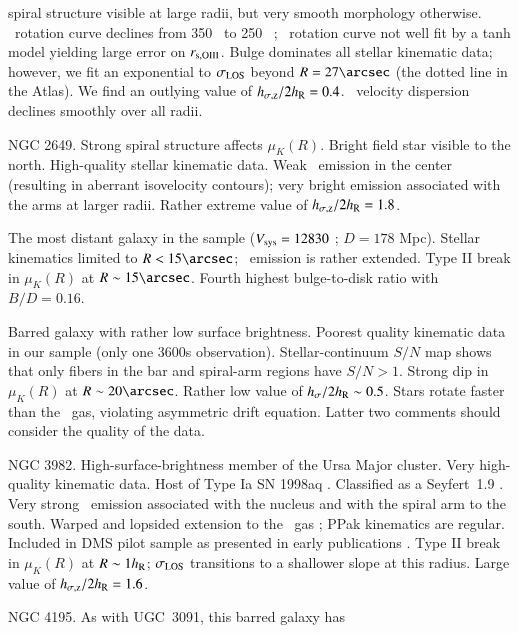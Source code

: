 \documentclass[traditabstract]{aa} %
\begin{document}
\begin{list}{}
  spiral structure visible at large radii, but very smooth morphology otherwise.
  \hone\ rotation curve declines from 350 \kms\ to 250 \kms\
  \citep{martinsson2011}; \oiii\ rotation curve not well fit by a tanh model
  yielding large error on $r_{\rm s,OIII}$.  Bulge dominates all stellar
  kinematic data; however, we fit an exponential to $\sigma_{\rm LOS}$ beyond $R=27\arcsec$
  (the dotted line in the Atlas). We find an outlying value of $h_{\sigma{\rm,z}}/2h_{\rm R}=0.4$.
  \oiii\ velocity dispersion declines smoothly over all radii.
%
  \item[{\bf UGC  4555:}] NGC 2649.  Strong spiral structure affects $\mu_K(R)$.
  Bright field star visible to the north.  High-quality stellar kinematic data.
  Weak \oiii\ emission in the center (resulting in aberrant isovelocity
  contours); very bright emission associated with the arms at larger radii.
  Rather extreme value of $h_{\sigma{\rm,z}}/2h_{\rm R}=1.8$.
%
  \item[{\bf UGC  4622:}] The most distant galaxy in the sample ($V_{\rm sys}=12830$
  \kms; $D=178$ Mpc).  Stellar kinematics limited to $R<15\arcsec$; \oiii\
  emission is rather extended.  Type II break in $\mu_K(R)$ at $R\sim15\arcsec$.
  Fourth highest bulge-to-disk ratio with $B/D=0.16$.
%
  \item[{\bf UGC  6903:}] Barred galaxy with rather low surface brightness.
  Poorest quality kinematic data in our sample (only one 3600s observation).
  Stellar-continuum $S/N$ map shows that only fibers in the bar and spiral-arm
  regions have $S/N>1$.  Strong dip in $\mu_K(R)$ at $R\sim20\arcsec$.
  Rather low value of $h_\sigma/2h_{\rm R}\sim0.5$. Stars rotate faster than the
  \oiii\ gas, violating asymmetric drift equation.  Latter two comments should
  consider the quality of the data.
%
  \item[{\bf UGC  6918:}] NGC 3982.  High-surface-brightness member of the Ursa
  Major cluster.  Very high-quality kinematic data.  Host of Type Ia SN 1998aq
  \citep{hurst1998, saha2001}.  Classified as a Seyfert~1.9
  \citep{veron2006}.  Very strong \oiii\ emission associated with the nucleus
  and with the spiral arm to the south.  Warped and lopsided extension to the
  \hone\ gas \citep{martinsson2011}; PPak kinematics are regular.  Included in
  DMS pilot sample as presented in early publications
  \citep{verheyen2004,bershady2005,westfall2009}.  Type II break in $\mu_K(R)$
  at $R\sim1h_{\rm R}$; $\sigma_{\rm LOS}$ transitions to a shallower slope at this radius.
  Large value of $h_{\sigma{\rm,z}}/2h_{\rm R} = 1.6$.
%
  \item[{\bf UGC  7244:}] NGC 4195. As with UGC~3091, this barred galaxy has

\end{list}
\end{document}
